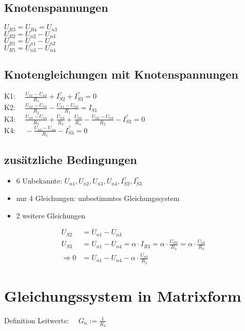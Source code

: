 \documentclass[11pt]{scrartcl}
\begin{document}
\subsection{Knotenspannungen}
\begin{doublespace}
\(\displaystyle U_{R3} = U_{R4} = U_{n3}\) \\
\(\displaystyle U_{R2} = U_{n2}- U_{n3}\) \\
\(\displaystyle U_{R1} = U_{n1}- U_{n2}\) \\
\(\displaystyle U_{R5} = U_{n3}- U_{n4}\)
\end{doublespace}

\subsection{Knotengleichungen mit Knotenspannungen}
\begin{spacing}{2.5}
  K1: \(\displaystyle \quad \frac{U_{n1} - U_{n2}}{R_1} + I_{S2}^? + I_{S3}^? = 0\) \\
  K2: \(\displaystyle \quad \frac{U_{n2} - U_{n3}}{R_2} - \frac{U_{n1} - U_{n2}}{R_1} = I_{S1}\) \\
  K3: \(\displaystyle \quad \frac{U_{n3} - U_{n4}}{R_5} + \frac{U_{n3}}{R_3} + \frac{U_{n3}}{R_4} - \frac{U_{n2} - U_{n3}}{R_2} - I_{S2}^?= 0\) \\
  K4: \(\displaystyle \quad - \frac{U_{n3} - U_{n4}}{R_5} - I_{S3}^? = 0\)
\end{spacing}

\subsection{zusätzliche Bedingungen}
\begin{itemize}
\item 6 Unbekannte: $U_{n1}, U_{n2}, U_{n3}, U_{n4}, I_{S2}^?, I_{S3}^?$
\item nur 4 Gleichungen: unbestimmtes Gleichungssystem
\item 2 weitere Gleichungen
\end{itemize}
\begin{align}
  U_{S2} &= U_{n1} - U_{n3} \\
  U_{S3} &= U_{n1} - U_{n4} = \alpha \cdot I_{R3} = \alpha \cdot \frac{U_{R3}}{R_3} = \alpha \cdot \frac{U_{n3}}{R_3} \nonumber \\
  \Longrightarrow 0 &= U_{n1} - U_{n4} - \alpha \cdot \frac{U_{n3}}{R_3}
\end{align}


\section{Gleichungssystem in Matrixform}
Definition Leitwerte: $\quad G_n := \frac{1}{R_n}$
\end{document}
